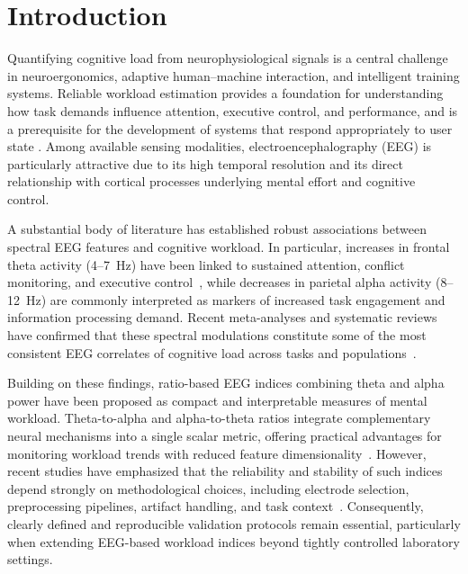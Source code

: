 \documentclass[conference]{IEEEtran}
\begin{document}



\section{Introduction}

Quantifying cognitive load from neurophysiological signals is a central challenge in neuroergonomics, adaptive human--machine interaction, and intelligent training systems. Reliable workload estimation provides a foundation for understanding how task demands influence attention, executive control, and performance, and is a prerequisite for the development of systems that respond appropriately to user state \cite{24}. Among available sensing modalities, electroencephalography (EEG) is particularly attractive due to its high temporal resolution and its direct relationship with cortical processes underlying mental effort and cognitive control.

A substantial body of literature has established robust associations between spectral EEG features and cognitive workload. In particular, increases in frontal theta activity (4--7~Hz) have been linked to sustained attention, conflict monitoring, and executive control~\cite{c8}, while decreases in parietal alpha activity (8--12~Hz) are commonly interpreted as markers of increased task engagement and information processing demand. Recent meta-analyses and systematic reviews have confirmed that these spectral modulations constitute some of the most consistent EEG correlates of cognitive load across tasks and populations~\cite{c1,c4}.

Building on these findings, ratio-based EEG indices combining theta and alpha power have been proposed as compact and interpretable measures of mental workload. Theta-to-alpha and alpha-to-theta ratios integrate complementary neural mechanisms into a single scalar metric, offering practical advantages for monitoring workload trends with reduced feature dimensionality~\cite{c1,c7}. However, recent studies have emphasized that the reliability and stability of such indices depend strongly on methodological choices, including electrode selection, preprocessing pipelines, artifact handling, and task context~\cite{c4,c6}. Consequently, clearly defined and reproducible validation protocols remain essential, particularly when extending EEG-based workload indices beyond tightly controlled laboratory settings.
\end{document}
